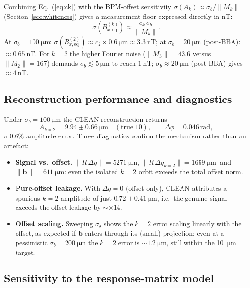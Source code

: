 \documentclass[preprint,12pt]{elsarticle}
\begin{document}
Combining Eq.~(\ref{eq:ck}) with the BPM-offset sensitivity
$\sigma(A_k)\approx\sigma_b/\|M_k\|$ (Section~\ref{sec:whiteness}) gives a
measurement floor expressed directly in nT:
\begin{equation}
\sigma(B_{x,\mathrm{eq}}^{(k)}) \approx \frac{c_k\,\sigma_b}{\|M_k\|}.
\label{eq:bxsens}
\end{equation}
At $\sigma_b=\SI{100}{\micro\meter}$: $\sigma(B_{x,\mathrm{eq}}^{(2)})\approx
c_2\times\SI{0.6}{\micro\meter}\approx\SI{3.3}{\nano\tesla}$; at
$\sigma_b=\SI{20}{\micro\meter}$ (post-BBA): $\approx\SI{0.65}{\nano\tesla}$.
For $k=3$ the higher Fourier noise ($\|M_3\|=43.6$ versus $\|M_2\|=167$) demands
$\sigma_b\lesssim\SI{5}{\micro\meter}$ to reach $\SI{1}{\nano\tesla}$;
$\sigma_b\approx\SI{20}{\micro\meter}$ (post-BBA) gives
$\approx\SI{4}{\nano\tesla}$.

\subsection{Reconstruction performance and diagnostics}

Under $\sigma_b=\SI{100}{\micro\meter}$ the CLEAN reconstruction returns
\begin{equation}
A_{k=2} = 9.94\pm0.66~\si{\micro\meter}
\quad(\text{true }10),\qquad
\Delta\phi = \SI{0.046}{\radian},
\end{equation}
a $0.6\%$ amplitude error. Three diagnostics confirm the mechanism rather
than an artefact:
\begin{itemize}
\item \textbf{Signal vs.\ offset.}
$\|R\,\Delta q\|=\SI{5271}{\micro\meter}$,
$\|R\,\Delta q_{k=2}\|=\SI{1669}{\micro\meter}$, and
$\|\mathbf{b}\|=\SI{611}{\micro\meter}$: even the isolated $k=2$ orbit
exceeds the total offset norm.
\item \textbf{Pure-offset leakage.} With $\Delta q=0$ (offset only),
CLEAN attributes a spurious $k=2$ amplitude of just
$0.72\pm\SI{0.41}{\micro\meter}$, i.e.\ the genuine signal exceeds the
offset leakage by $\sim\times14$.
\item \textbf{Offset scaling.} Sweeping $\sigma_b$ shows the $k=2$ error
scaling linearly with the offset, as expected if $\mathbf{b}$ enters
through its (small) projection; even at a pessimistic
$\sigma_b=\SI{200}{\micro\meter}$ the $k=2$ error is
$\sim\SI{1.2}{\micro\meter}$, still within the \SI{10}{\micro\meter} target.
\end{itemize}

\subsection{Sensitivity to the response-matrix model}
\end{document}
